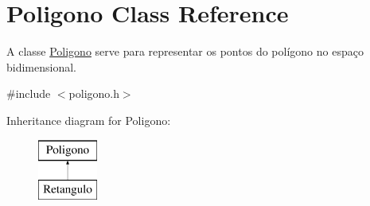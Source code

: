\hypertarget{class_poligono}{}\section{Poligono Class Reference}
\label{class_poligono}


A classe \mbox{\hyperlink{class_poligono}{Poligono}} serve para representar os pontos do polígono no espaço bidimensional.  




{\ttfamily \#include $<$poligono.\+h$>$}

Inheritance diagram for Poligono\+:\begin{figure}[H]
\begin{center}
\leavevmode
\includegraphics[height=2.000000cm]{class_poligono}
\end{center}
\end{figure}
